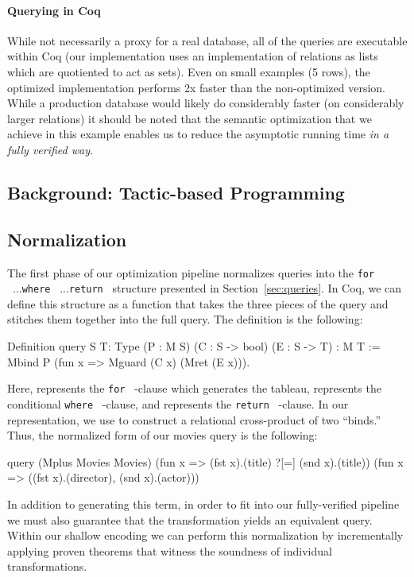 \documentclass[preprint]{sigplanconf}
\newcommand{\FOR}{{\tt for} \ }
\newcommand{\WHERE}{{\tt where} \ }
\newcommand{\RETURN}{{\tt return} \ }
\begin{document}
\paragraph{Querying in Coq} While not necessarily a proxy for a real database, all of the queries are executable within Coq (our implementation uses an implementation of relations as lists which are quotiented to act as sets).
Even on small examples (5 rows), the optimized implementation performs 2x faster than the non-optimized version.
While a production database would likely do considerably faster (on considerably larger relations) it should be noted that the semantic optimization that we achieve in this example enables us to reduce the asymptotic running time \emph{in a fully verified way}.

\subsection{Background: Tactic-based Programming}

\subsection{Normalization}
\label{sec:normalization}

The first phase of our optimization pipeline normalizes queries into the \FOR...\WHERE...\RETURN structure presented in Section~\ref{sec:queries}.
In Coq, we can define this structure as a function that takes the three pieces of the query and stitches them together into the full query.
The definition is the following:
\begin{coq}
Definition query {S T: Type}
  (P : M S) (C : S -> bool) (E : S -> T) : M T :=
  Mbind P (fun x => Mguard (C x) (Mret (E x))).

\end{coq}
Here,  represents the \FOR-clause which generates the tableau,
 represents the conditional \WHERE-clause, and  represents the \RETURN-clause.
In our representation, we use  to construct a relational cross-product of two ``binds.''
Thus, the normalized form of our movies query is the following:
\begin{coq}
query (Mplus Movies Movies)
      (fun x => (fst x).(title) ?[=] (snd x).(title))
      (fun x => ((fst x).(director), (snd x).(actor)))
\end{coq}

In addition to generating this term, in order to fit into our fully-verified pipeline we must also guarantee that the transformation yields an equivalent query.
Within our shallow encoding we can perform this normalization by incrementally applying proven theorems that witness the soundness of individual transformations.
\end{document}
